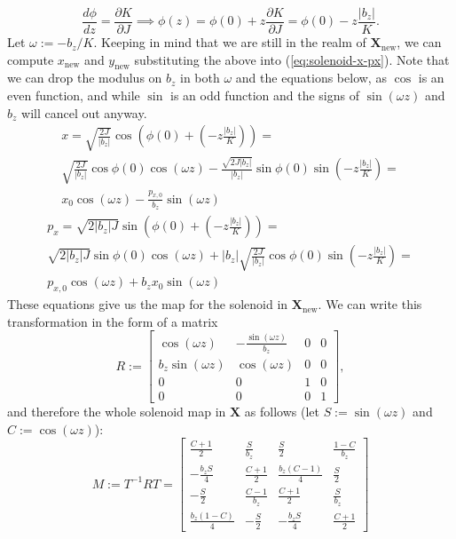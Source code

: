 \[
  \frac{d \phi}{d z} = \frac{\partial K}{\partial J} \implies \phi(z) = \phi(0) + z \frac{\partial K}{\partial J} = \phi(0) - z\frac{|b_z|}{K}.
\]
Let $\omega := -b_z / K$. Keeping in mind that we are still in the realm of $\mathbf{X}_\text{new}$, we can compute $x_\text{new}$ and $y_\text{new}$ substituting the above into (\ref{eq:solenoid-x-px}).
Note that we can drop the modulus on $b_z$ in both $\omega$ and the equations below, as $\cos$ is an even function, and while $\sin$ is an odd function and the signs of $\sin(\omega z)$ and $b_z$ will cancel out anyway.
\begin{multline*}
  x = \sqrt{\frac{2J}{|b_z|}} \cos\left(\phi(0) + \left(- z\frac{|b_z|}{K}\right)\right) = \\
    \sqrt{\frac{2J}{|b_z|}} \cos\phi(0) \cos(\omega z) - \frac{\sqrt{2J|b_z|}}{|b_z|} \sin\phi(0) \sin\left(- z\frac{|b_z|}{K}\right) = \\
    x_0 \cos(\omega z) - \frac{p_{x,0}}{b_z} \sin(\omega z)
\end{multline*}
\begin{multline*}
  p_x = \sqrt{2 |b_z| J} \sin\left(\phi(0) + \left(- z\frac{|b_z|}{K}\right)\right) = \\
    \sqrt{2 |b_z| J} \sin\phi(0) \cos(\omega z) + |b_z| \sqrt{\frac{2J}{|b_z|}} \cos\phi(0) \sin\left(- z\frac{|b_z|}{K}\right) = \\
    p_{x,0} \cos(\omega z) + b_z x_0 \sin(\omega z)
\end{multline*}
These equations give us the map for the solenoid in $\mathbf{X}_\text{new}$.
We can write this transformation in the form of a matrix
\[
R := \begin{bmatrix}
  \cos(\omega z) & -\frac{\sin(\omega z)}{b_z} & 0 & 0 \\
  b_z \sin(\omega z) & \cos(\omega z) & 0 & 0 \\
  0 & 0 & 1 & 0 \\
  0 & 0 & 0 & 1
\end{bmatrix},
\]
and therefore the whole solenoid map in $\mathbf{X}$ as follows (let $S := \sin(\omega z)$ and $C := \cos(\omega z)$):
\[
  M := T^{-1} R T = \begin{bmatrix}
    \frac{C + 1}{2} &
    \frac{S}{b_z} &
    \frac{S}{2} &
    \frac{1 - C}{b_z} \\[6pt]
    -\frac{b_z S}{4} &
    \frac{C + 1}{2} &
    \frac{b_z (C - 1)}{4} &
    \frac{S}{2} \\[6pt]
    -\frac{S}{2} &
    \frac{C - 1}{b_z} &
    \frac{C + 1}{2} &
    \frac{S}{b_z} \\[6pt]
    \frac{b_z (1 - C)}{4} &
    -\frac{S}{2} &
    -\frac{b_z S}{4} &
    \frac{C + 1}{2}
  \end{bmatrix}
\]

